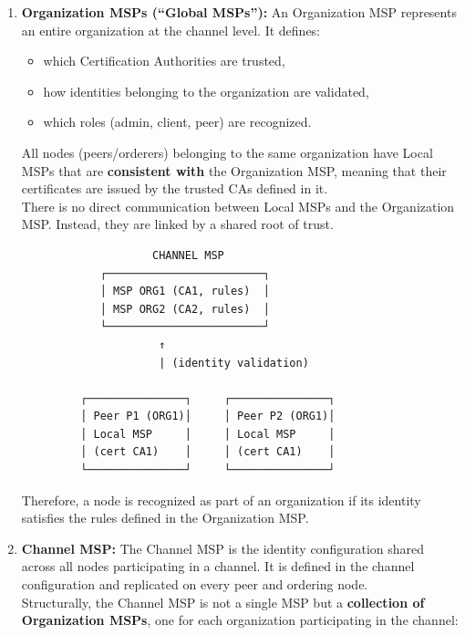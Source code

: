 \documentclass{scrbook}
\begin{document}
\begin{itemize}
\begin{enumerate}
        \item \textbf{Organization MSPs (``Global MSPs''):} An Organization MSP represents an entire organization at the channel level. It defines:
        \begin{itemize}
            \item which Certification Authorities are trusted,
            \item how identities belonging to the organization are validated,
            \item which roles (admin, client, peer) are recognized.
        \end{itemize}
    
        All nodes (peers/orderers) belonging to the same organization have Local MSPs that are \textbf{consistent with} the Organization MSP, meaning that their certificates are issued by the trusted CAs defined in it.\\
    
        There is no direct communication between Local MSPs and the Organization MSP. Instead, they are linked by a shared root of trust.
    
        \begin{center}
        \begin{verbatim}
                    CHANNEL MSP
            ┌────────────────────────┐
            │ MSP ORG1 (CA1, rules)  │
            │ MSP ORG2 (CA2, rules)  │
            └────────────────────────┘
                     ↑
                     | (identity validation)
    
         ┌───────────────┐     ┌───────────────┐
         │ Peer P1 (ORG1)│     │ Peer P2 (ORG1)│
         │ Local MSP     │     │ Local MSP     │
         │ (cert CA1)    │     │ (cert CA1)    │
         └───────────────┘     └───────────────┘
        \end{verbatim}
        \end{center}
    
        Therefore, a node is recognized as part of an organization if its identity satisfies the rules defined in the Organization MSP.
    
        \item \textbf{Channel MSP:} The Channel MSP is the identity configuration shared across all nodes participating in a channel. It is defined in the channel configuration and replicated on every peer and ordering node.\\
    
        Structurally, the Channel MSP is not a single MSP but a \textbf{collection of Organization MSPs}, one for each organization participating in the channel:
    

\end{enumerate}
\end{itemize}
\end{document}
